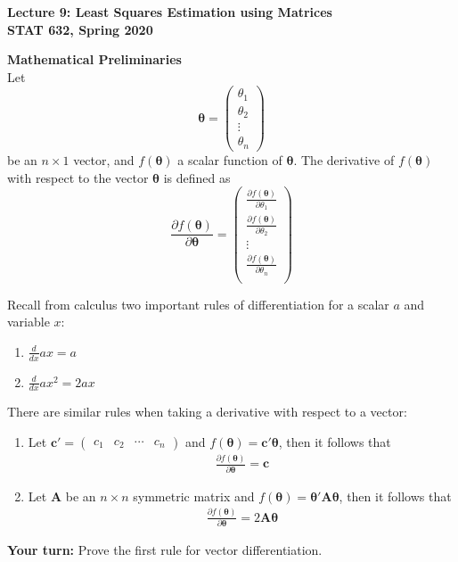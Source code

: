 \documentclass[11pt, fleqn]{article}\usepackage[]{graphicx}\usepackage[]{color}
\begin{document}
\setlength\parindent{0pt}

\begin{center}
\textbf{Lecture 9: Least Squares Estimation using Matrices}\\
\textbf{STAT 632, Spring 2020}\\
\hrulefill
\end{center}

\textbf{Mathematical Preliminaries}\\
Let 
\[
\bm{\theta} = 
\begin{pmatrix}
\theta_1 \\
\theta_2 \\
\vdots \\
\theta_n
\end{pmatrix}
\]
be an $n \times 1$ vector, and $f(\bm{\theta})$ a scalar function of $\bm{\theta}$.  The derivative of $f(\bm{\theta})$ with respect to the vector $\bm{\theta}$ is defined as
\[
\frac{\partial f(\bm{\theta})}{\partial \bm{\theta}} = 
\begin{pmatrix}
\frac{\partial f(\bm{\theta})}{\partial \theta_1}\\
\frac{\partial f(\bm{\theta})}{\partial \theta_2}\\
\vdots\\
\frac{\partial f(\bm{\theta})}{\partial \theta_n}\\
\end{pmatrix}
\]

Recall from calculus two important rules of differentiation for a scalar $a$ and variable $x$:
\begin{enumerate}
\item $\frac{d}{dx} ax = a$
\item $\frac{d}{dx} a x^2 = 2ax$
\end{enumerate}

There are similar rules when taking a derivative with respect to a vector:
\begin{enumerate}
\item Let $\bm{c'} = \begin{pmatrix} c_1 & c_2 & \cdots & c_n\end{pmatrix}$ and $f(\bm{\theta}) = \bm{c'} \bm{\theta}$, then it follows that
\begin{align*}
\frac{\partial f(\bm{\theta})}{\partial \bm{\theta}} = \bm{c}
\end{align*}

\item Let $\bm{A}$ be an $n \times n$ symmetric matrix and $f(\bm{\theta}) = \bm{\theta'} \bm{A} \bm{\theta}$, then it follows that
\begin{align*}
\frac{\partial f(\bm{\theta})}{\partial \bm{\theta}} = 2 \bm{A \theta}
\end{align*}
\end{enumerate}
\textbf{Your turn:}  Prove the first rule for vector differentiation.
\end{document}

